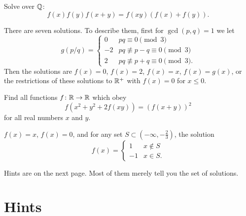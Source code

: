 \documentclass[11pt]{scrartcl}
\begin{document}
\begin{problem}
  \label{prob:sevensol}
  Solve over $\mathbb Q$: \[ f(x)f(y)f(x+y) = f(xy)(f(x) + f(y)). \]
  \begin{hint}
    There are seven solutions. To describe them, first for $\gcd(p,q) = 1$ we let
    \[ g(p/q) =
      \begin{cases}
        0 & pq \equiv 0 \pmod 3 \\
        -2 & pq \not\equiv p-q \equiv 0 \pmod 3 \\
        2 & pq \not\equiv p+q \equiv 0 \pmod 3.
      \end{cases}
    \]
    Then the solutions are $f(x) = 0$, $f(x) = 2$, $f(x) = x$, $f(x) = g(x)$,
    or the restrictions of these solutions to $\mathbb R^+$ with $f(x) = 0$ for $x \le 0$.
  \end{hint}
\end{problem}

\begin{problem}
  [Shortlist 2004 A6]
  \label{prob:SL2004A6}
  Find all functions $f\colon \mathbb R \to \mathbb R$ which obey
  \[ f(x^2+y^2+2f(xy)) = (f(x+y))^2 \]
  for all real numbers $x$ and $y$.
  \begin{hint}
    $f(x) = x$, $f(x) = 0$, and for any set $S \subset (-\infty, -\frac23)$, the solution
    \[
      f(x) =
      \begin{cases}
        1 & x \notin S \\
        -1 & x \in S.
      \end{cases}
    \]
  \end{hint}
\end{problem}

\vspace{2em}

\noindent Hints are on the next page.
Most of them merely tell you the set of solutions.

\eject

\section{Hints}
\makehints
\end{document}
